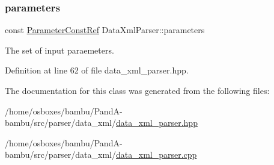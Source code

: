 \subsubsection{\texorpdfstring{parameters}{parameters}}
{\footnotesize\ttfamily const \hyperlink{Parameter_8hpp_a37841774a6fcb479b597fdf8955eb4ea}{Parameter\+Const\+Ref} Data\+Xml\+Parser\+::parameters\hspace{0.3cm}{\ttfamily [private]}}



The set of input paraemeters. 



Definition at line 62 of file data\+\_\+xml\+\_\+parser.\+hpp.



The documentation for this class was generated from the following files\+:\begin{DoxyCompactItemize}
\item 
/home/osboxes/bambu/\+Pand\+A-\/bambu/src/parser/data\+\_\+xml/\hyperlink{data__xml__parser_8hpp}{data\+\_\+xml\+\_\+parser.\+hpp}\item 
/home/osboxes/bambu/\+Pand\+A-\/bambu/src/parser/data\+\_\+xml/\hyperlink{data__xml__parser_8cpp}{data\+\_\+xml\+\_\+parser.\+cpp}\end{DoxyCompactItemize}
